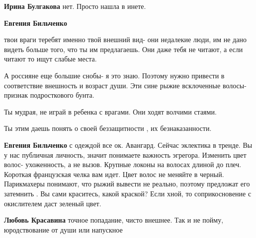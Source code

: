 \begin{itemize}
\begin{itemize}
 
\textbf{Ирина Булгакова} нет. Просто нашла в инете.

 
\textbf{Евгения Бильченко} 

твои враги теребят именно твой внешний вид- они недалекие люди, им не дано
видеть больше того, что ты им предлагаешь. Они даже тебя не читают, а если
читают то ищут слабые места.

А россияне еще большие снобы- я это знаю. Поэтому нужно привести в соответствие
внешность и возраст души. Эти сине рыжие всклоченные волосы- признак
подросткового бунта.

Ты мудрая, не играй в ребенка с врагами. Они ходят волчими стаями.

Ты этим даешь понять о своей беззащитности , их безнаказанности.

 
\textbf{Евгения Бильченко} с одеждой все ок. Авангард. Сейчас эклектика в тренде.
Вы у нас публичная личность, значит понимаете важность эгрегора.
Изменить цвет волос- ухоженность, а не вызов.
Крупные локоны на волосах длиной до плеч. Короткая французская челка вам идет. Цвет волос не меняйте в черный. Парикмахеры понимают, что рыжий вывести не реально, поэтому предложат его затемнить .
Вы сами краситесь, какой краской? Если хной, то соприкосновение с окислителем даст зеленый цвет.

 
\textbf{Любовь Красавина} точное попадание, чисто внешнее. Так и не пойму, юродствование от души или напускное


\end{itemize}
\end{itemize}
